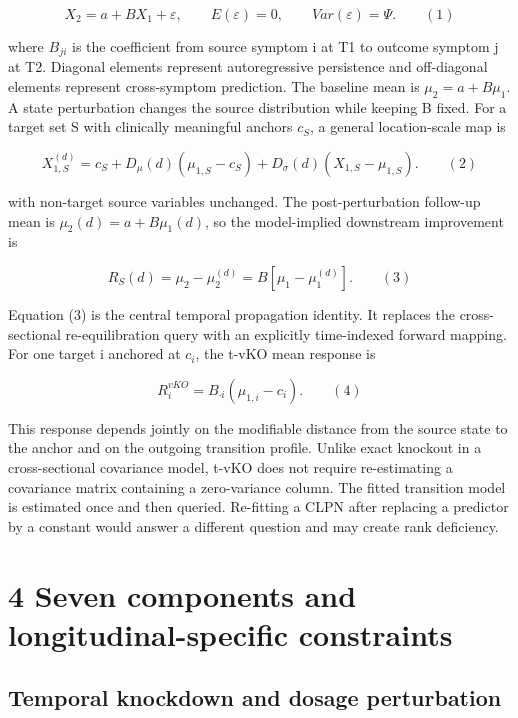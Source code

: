 \documentclass[11pt]{article}
\begin{document}
\[X_{2} = a + BX_{1} + \varepsilon,\quad\quad E(\varepsilon) = 0,\quad\quad Var(\varepsilon) = \Psi.\quad\quad(1)\]

where \(B_{ji}\) is the coefficient from source symptom i at T1 to outcome
symptom j at T2. Diagonal elements represent autoregressive persistence
and off-diagonal elements represent cross-symptom prediction. The
baseline mean is \(\mu_2=a+B\mu_1\). A state perturbation changes the source
distribution while keeping B fixed. For a target set S with clinically
meaningful anchors \(c_S\), a general location-scale map is

\[X_{1,S}^{(d)} = c_{S} + D_{\mu}(d)\left( \mu_{1,S} - c_{S} \right) + D_{\sigma}(d)\left( X_{1,S} - \mu_{1,S} \right).\quad\quad(2)\]

with non-target source variables unchanged. The post-perturbation
follow-up mean is \(\mu_2(d)=a+B\mu_1(d)\), so the model-implied downstream
improvement is

\[R_{S}(d) = \mu_{2} - \mu_{2}^{(d)} = B\left\lbrack \mu_{1} - \mu_{1}^{(d)} \right\rbrack.\quad\quad(3)\]

Equation (3) is the central temporal propagation identity. It replaces
the cross-sectional re-equilibration query with an explicitly
time-indexed forward mapping. For one target i anchored at \(c_i\), the t-vKO
mean response is

\[R_{i}^{vKO} = B_{\cdot i}\left( \mu_{1,i} - c_{i} \right).\quad\quad(4)\]

This response depends jointly on the modifiable distance from the source
state to the anchor and on the outgoing transition profile. Unlike exact
knockout in a cross-sectional covariance model, t-vKO does not require
re-estimating a covariance matrix containing a zero-variance column. The
fitted transition model is estimated once and then queried. Re-fitting a
CLPN after replacing a predictor by a constant would answer a different
question and may create rank deficiency.

\section{4 Seven components and longitudinal-specific
constraints}\label{seven-components-and-longitudinal-specific-constraints}

\subsection{Temporal knockdown and dosage
perturbation}\label{temporal-knockdown-and-dosage-perturbation}
\end{document}
